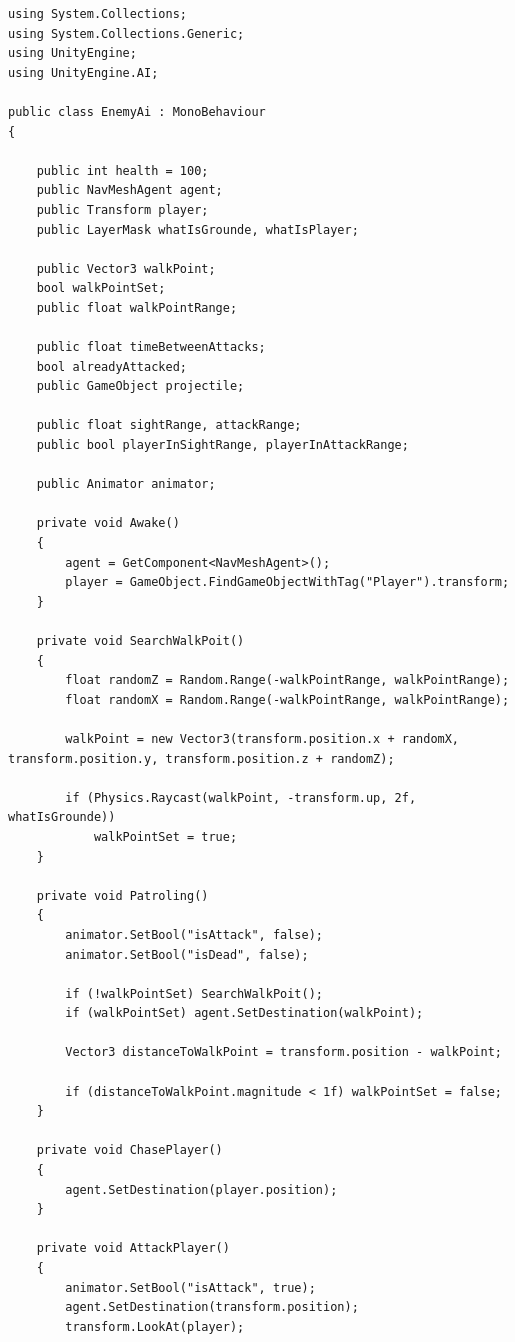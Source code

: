 \documentclass[10pt,a4paper]{article}
\begin{document}
\begin{lstlisting}[caption={Skrypt 'EnemyAi' - zachowanie oraz poruszanie się przeciwników}]
using System.Collections;
using System.Collections.Generic;
using UnityEngine;
using UnityEngine.AI;

public class EnemyAi : MonoBehaviour
{

    public int health = 100;
    public NavMeshAgent agent;
    public Transform player;
    public LayerMask whatIsGrounde, whatIsPlayer;

    public Vector3 walkPoint;
    bool walkPointSet;
    public float walkPointRange;

    public float timeBetweenAttacks;
    bool alreadyAttacked;
    public GameObject projectile;

    public float sightRange, attackRange;
    public bool playerInSightRange, playerInAttackRange;

    public Animator animator;

    private void Awake()
    {
        agent = GetComponent<NavMeshAgent>();
        player = GameObject.FindGameObjectWithTag("Player").transform;
    }

    private void SearchWalkPoit()
    {
        float randomZ = Random.Range(-walkPointRange, walkPointRange);
        float randomX = Random.Range(-walkPointRange, walkPointRange);

        walkPoint = new Vector3(transform.position.x + randomX, transform.position.y, transform.position.z + randomZ);

        if (Physics.Raycast(walkPoint, -transform.up, 2f, whatIsGrounde))
            walkPointSet = true;
    }

    private void Patroling()
    {
        animator.SetBool("isAttack", false);
        animator.SetBool("isDead", false);

        if (!walkPointSet) SearchWalkPoit();
        if (walkPointSet) agent.SetDestination(walkPoint);

        Vector3 distanceToWalkPoint = transform.position - walkPoint;

        if (distanceToWalkPoint.magnitude < 1f) walkPointSet = false;
    }

    private void ChasePlayer()
    {
        agent.SetDestination(player.position);
    }

    private void AttackPlayer()
    {
        animator.SetBool("isAttack", true);
        agent.SetDestination(transform.position);
        transform.LookAt(player);


\end{lstlisting}
\end{document}
